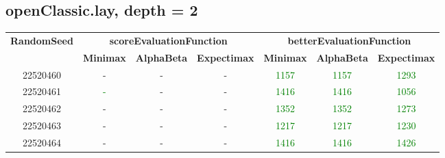 \documentclass[english, a4paper,12pt]{article}
\begin{document}
\subsection*{openClassic.lay, depth = 2}
\small\begin{tabular}{|c|c|c|c|c|c|c|}
\hline
\textbf{RandomSeed} & \multicolumn{3}{c|}{\textbf{scoreEvaluationFunction}} & \multicolumn{3}{c|}{\textbf{betterEvaluationFunction}} \\
\cline{2-7}
& \textbf{Minimax} & \textbf{AlphaBeta} & \textbf{Expectimax} & \textbf{Minimax} & \textbf{AlphaBeta} & \textbf{Expectimax} \\
\hline
22520460 & \textcolor{red!70}{-} & \textcolor{red!70}{-} & \textcolor{red!70}{-} & \textcolor{Green}{1157} & \textcolor{Green}{1157} & \textcolor{Green}{1293} \\
22520461 & \textcolor{Green}{-} & \textcolor{red!70}{-} & \textcolor{red!70}{-} & \textcolor{Green}{1416} & \textcolor{Green}{1416} & \textcolor{Green}{1056} \\
22520462 & \textcolor{red!70}{-} & \textcolor{red!70}{-} & \textcolor{red!70}{-} & \textcolor{Green}{1352} & \textcolor{Green}{1352} & \textcolor{Green}{1273} \\
22520463 & \textcolor{red!70}{-} & \textcolor{red!70}{-} & \textcolor{red!70}{-} & \textcolor{Green}{1217} & \textcolor{Green}{1217} & \textcolor{Green}{1230} \\
22520464 & \textcolor{red!70}{-} & \textcolor{red!70}{-} & \textcolor{red!70}{-} & \textcolor{Green}{1416} & \textcolor{Green}{1416} & \textcolor{Green}{1426} \\
\hline
\end{tabular}
\end{document}
